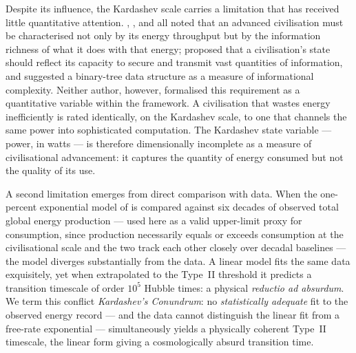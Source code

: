 Despite its influence, the Kardashev scale carries a limitation that has received
little quantitative attention. \citet{Kardashev1964}, \citet{Sagan1973}, and
\citet{ShklovskiiSagan1966} all noted that an advanced civilisation must be
characterised not only by its energy throughput but by the information richness of what
it does with that energy; \citet{Sagan1973} proposed that a civilisation's state should
reflect its capacity to secure and transmit vast quantities of information, and
suggested a binary-tree data structure as a measure of informational complexity.
Neither author, however, formalised this requirement as a quantitative variable within
the framework. A civilisation that wastes energy inefficiently is rated identically, on
the Kardashev scale, to one that channels the same power into sophisticated
computation. The Kardashev state variable --- power, in watts --- is therefore
dimensionally incomplete as a measure of civilisational advancement: it captures the
quantity of energy consumed but not the quality of its use.

A second limitation emerges from direct comparison with data. When the one-percent
exponential model of \citet{Kardashev1964} is compared against six decades of observed
total global energy production \citep{Ritchie2022} --- used here as a valid upper-limit
proxy for consumption, since production necessarily equals or exceeds consumption at the
civilisational scale and the two track each other closely over decadal baselines --- the
model diverges substantially from the data. A linear model fits the same data
exquisitely, yet when extrapolated to the Type~II threshold it predicts a transition
timescale of order $10^5$ Hubble times: a physical \emph{reductio ad absurdum}. We term
this conflict \emph{Kardashev's Conundrum}: no \emph{statistically adequate} fit to the
observed energy record --- and the data cannot distinguish the linear fit from a free-rate
exponential --- simultaneously yields a physically coherent Type~II timescale, the linear
form giving a cosmologically absurd transition time.


